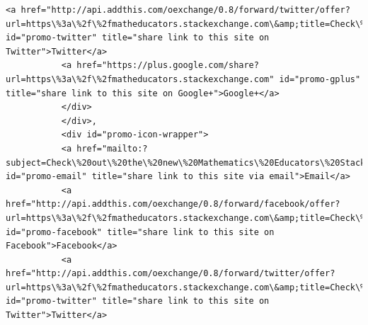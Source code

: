 \documentclass[11pt]{article}
\begin{document}
\begin{Verbatim}[commandchars=\\\{\}]
           <a href="http://api.addthis.com/oexchange/0.8/forward/twitter/offer?url=https\%3a\%2f\%2fmatheducators.stackexchange.com\&amp;title=Check\%20out\%20the\%20new\%20Mathematics\%20Educators\%20Stack\%20Exchange\%20QnA\%20site\%20from\%20\%40StackExchange\&amp;username=stackoverflow\&amp;template=\%7B\%7Btitle\%7D\%7D\%20\%7B\%7Burl\%7D\%7D" id="promo-twitter" title="share link to this site on Twitter">Twitter</a>
           <a href="https://plus.google.com/share?url=https\%3a\%2f\%2fmatheducators.stackexchange.com" id="promo-gplus" title="share link to this site on Google+">Google+</a>
           </div>
           </div>,
           <div id="promo-icon-wrapper">
           <a href="mailto:?subject=Check\%20out\%20the\%20new\%20Mathematics\%20Educators\%20Stack\%20Exchange\%20Q\%26A\%20site\%20from\%20Stack\%20Exchange\&amp;body=Hi!\%0d\%0a\%0d\%0aI\%27m\%20supporting\%20a\%20new\%20Q\%26A\%20website\%20for\%20those\%20involved\%20in\%20the\%20field\%20of\%20teaching\%20mathematics.\%0d\%0a\%0d\%0aIt\%27s\%20built\%20on\%20the\%20same\%20software\%20as\%20stackoverflow.com\%2c\%20a\%20hugely\%20popular\%20site\%20where\%20over\%20seven\%20million\%20programmers\%20help\%20each\%20other\%20with\%20difficult\%20programming\%20problems.\%20On\%20Stack\%20Overflow\%20the\%20audience\%20votes\%20for\%20the\%20best\%20answer\%2c\%20so\%20the\%20answer\%20you\%20want\%20is\%20usually\%20right\%20at\%20the\%20top\%2c\%20not\%20on\%20page\%20five.\%0d\%0a\%0d\%0aI\%27m\%20hoping\%20that\%20a\%20site\%20for\%20those\%20involved\%20in\%20the\%20field\%20of\%20teaching\%20mathematics\%20would\%20have\%20the\%20same\%20kind\%20of\%20network\%20effect\%20and\%20turn\%20into\%20an\%20amazing\%20resource.\%0d\%0a\%0d\%0aThe\%20public\%20beta\%20is\%20going\%20on\%20here\%2c\%20if\%20you\%27re\%20interested\%20in\%20participating\%3a\%0d\%0a\%0d\%0ahttps\%3a\%2f\%2fmatheducators.stackexchange.com\%0d\%0a\%0d\%0aThanks!" id="promo-email" title="share link to this site via email">Email</a>
           <a href="http://api.addthis.com/oexchange/0.8/forward/facebook/offer?url=https\%3a\%2f\%2fmatheducators.stackexchange.com\&amp;title=Check\%20out\%20the\%20new\%20Mathematics\%20Educators\%20Stack\%20Exchange\%20Q\%26A\%20site\%20from\%20Stack\%20Exchange\&amp;username=stackoverflow" id="promo-facebook" title="share link to this site on Facebook">Facebook</a>
           <a href="http://api.addthis.com/oexchange/0.8/forward/twitter/offer?url=https\%3a\%2f\%2fmatheducators.stackexchange.com\&amp;title=Check\%20out\%20the\%20new\%20Mathematics\%20Educators\%20Stack\%20Exchange\%20QnA\%20site\%20from\%20\%40StackExchange\&amp;username=stackoverflow\&amp;template=\%7B\%7Btitle\%7D\%7D\%20\%7B\%7Burl\%7D\%7D" id="promo-twitter" title="share link to this site on Twitter">Twitter</a>

\end{Verbatim}
\end{document}
